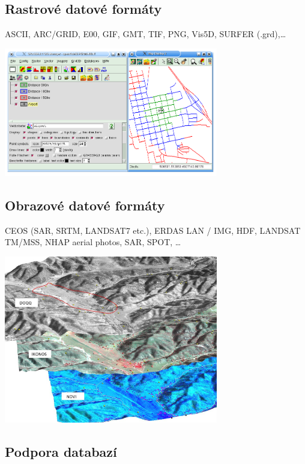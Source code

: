 \documentclass[notumble,a4paper,10pt,nofoldmark]{leaflet}
\newenvironment{myfig}[1][0pt plus 1.5ex minus .5ex]{\par\vspace*{#1}\begin{minipage}{\textwidth}\centering}{\end{minipage}}
\begin{document}
\subsection{Rastrové datové formáty}
ASCII, ARC/GRID, E00, GIF, GMT, TIF, PNG, Vis5D, SURFER (.grd),\dots
\begin{myfig}
\includegraphics[width=0.7\textwidth]{isodist}
\end{myfig}

\subsection{Obrazové datové formáty}

CEOS (SAR, SRTM, LANDSAT7 etc.), ERDAS LAN / IMG, HDF, LANDSAT TM/MSS, NHAP aerial photos, SAR, SPOT, \dots
\begin{myfig}[1.5ex]
\includegraphics[width=0.7\textwidth]{ndvi}
\end{myfig}

\subsection{Podpora databazí}
\end{document}
